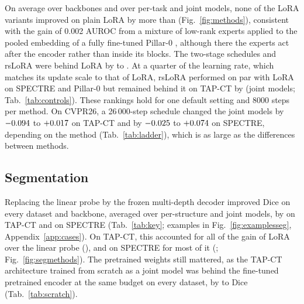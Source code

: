 On average over backbones and over per-task and joint models, none of the LoRA variants improved on plain LoRA by more than \magn{\numVsloraAllBabmilMeandiff} (Fig.~\ref{fig:methods}), consistent with the gain of 0.002 AUROC from a mixture of low-rank experts applied to the pooled embedding of a fully fine-tuned Pillar-0 \citep{yoo2026molre}, although there the experts act after the encoder rather than inside its blocks. The two-stage schedules and rsLoRA were behind LoRA by \magn{\numVsloraAllLinThenLoragMeandiff} to \magn{\numVsloraAllAttnThenLoragMeandiff}. At a quarter of the learning rate, which matches its update scale to that of LoRA, rsLoRA performed on par with LoRA on SPECTRE and Pillar-0 but remained behind it on TAP-CT by \magn{\numCtrlTapctRsloraLowlrLoraMeandiff} (joint models; Tab.~\ref{tab:controls}). These rankings hold for one default setting and 8000 steps per method. On CVPR26, a 26\,000-step schedule changed the joint models by $-0.094$ to $+0.017$ on TAP-CT and by $-0.025$ to $+0.074$ on SPECTRE, depending on the method (Tab.~\ref{tab:ladder}), which is as large as the differences between methods.

\subsection{Segmentation}
\label{sec:segres}

Replacing the linear probe by the frozen multi-depth decoder improved Dice on every dataset and backbone, averaged over per-structure and joint models, by \magn{\numSegdeltaTapctLinDecMeandiff} on TAP-CT and \magn{\numSegdeltaSpectreLinDecMeandiff} on SPECTRE (Tab.~\ref{tab:key}; examples in Fig.~\ref{fig:examplesseg}, Appendix~\ref{app:cases}). On TAP-CT, this accounted for all of the gain of LoRA over the linear probe (\magn{\numSegdeltaTapctLinLoraMeandiff}), and on SPECTRE for most of it (\magn{\numSegdeltaSpectreLinLoraMeandiff}; Fig.~\ref{fig:segmethods}). The pretrained weights still mattered, as the TAP-CT architecture trained from scratch as a joint model was behind the fine-tuned pretrained encoder at the same budget on every dataset, by \magn{\numScratchLitsTapctMeandiff} to \magn{\numScratchTotalsegTapctMeandiff} Dice (Tab.~\ref{tab:scratch}).

